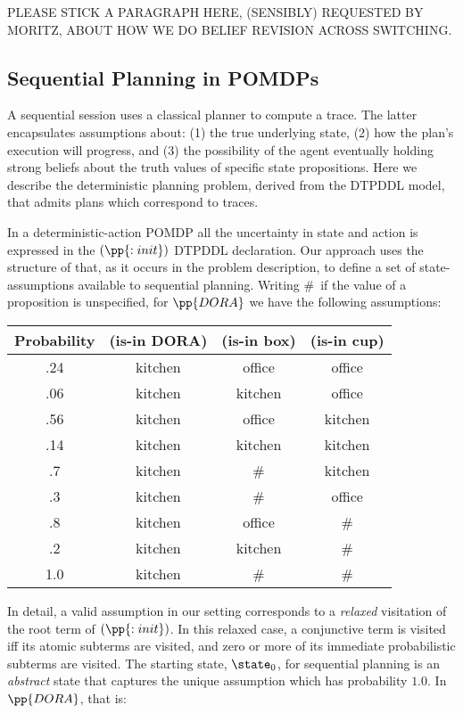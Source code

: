 PLEASE STICK A PARAGRAPH HERE, (SENSIBLY) REQUESTED BY MORITZ, ABOUT
HOW WE DO BELIEF REVISION ACROSS SWITCHING.


\subsection{Sequential Planning in POMDPs}

A sequential session uses a classical planner to compute a trace. The
latter encapsulates assumptions about: (1) the true underlying state,
(2) how the plan's execution will progress, and (3) the possibility of
the agent eventually holding strong beliefs about the truth values of
specific state propositions. Here we describe the deterministic
planning problem, derived from the DTPDDL model, that admits plans
which correspond to traces.

In a deterministic-action POMDP all the uncertainty in state and
action is expressed in the $(\pp{:init})$ DTPDDL declaration. Our
approach uses the structure of that, as it occurs in the problem
description, to define a set of state-assumptions available to
sequential planning.
Writing \#\ if the value of a proposition is unspecified, for
$\pp{DORA}$ we have the following assumptions:

\small
\begin{tabular}{cccc}
\hline
Probability & (is-in DORA)  & (is-in box)  & (is-in cup) \\
\hline
.24 & kitchen & office & office \\
.06 & kitchen & kitchen & office \\
.56 & kitchen & office & kitchen \\
.14 & kitchen & kitchen & kitchen \\
.7 & kitchen & \# &  kitchen\\
.3 & kitchen & \# & office \\
.8 & kitchen & office & \# \\
.2 & kitchen & kitchen & \# \\
1.0 & kitchen & \# & \# \\
\hline
\end{tabular}
\normalsize

\noindent In detail, a valid assumption in our setting corresponds to a {\em
relaxed} visitation of the root term of $(\pp{:init})$. In this
relaxed case, a conjunctive term is visited iff its atomic subterms
are visited, and zero or more of its immediate probabilistic subterms
are visited. The starting state, $\state_0$, for sequential planning
is an {\em abstract} state that captures the unique assumption which
has probability $1.0$. In $\pp{DORA}$, that is:

